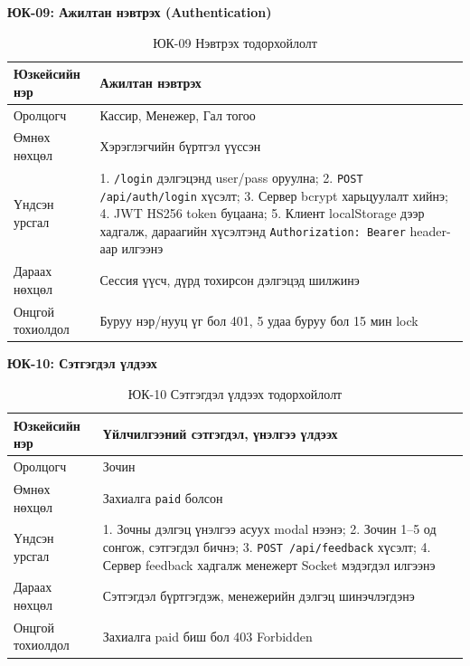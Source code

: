 \textbf{ЮК-09: Ажилтан нэвтрэх (Authentication)}

\begin{table}[htbp]
\caption{ЮК-09 Нэвтрэх тодорхойлолт}
\label{tab:uc09}
\centering
\small
\begin{tabularx}{\textwidth}{|L|L|}
\hline
{}
Юзкейсийн нэр & Ажилтан нэвтрэх \\ \hline
Оролцогч & Кассир, Менежер, Гал тогоо \\ \hline
{}
Өмнөх нөхцөл & Хэрэглэгчийн бүртгэл үүссэн \\ \hline
Үндсэн урсгал & 1. \texttt{/login} дэлгэцэнд user/pass оруулна;
  2. \texttt{POST /api/auth/login} хүсэлт;
  3. Сервер bcrypt харьцуулалт хийнэ;
  4. JWT HS256 token буцаана;
  5. Клиент localStorage дээр хадгалж, дараагийн хүсэлтэнд \texttt{Authorization: Bearer} header-аар илгээнэ \\ \hline
{}
Дараах нөхцөл & Сессия үүсч, дүрд тохирсон дэлгэцэд шилжинэ \\ \hline
Онцгой тохиолдол & Буруу нэр/нууц үг бол 401, 5 удаа буруу бол 15 мин lock \\ \hline
\end{tabularx}
\end{table}

\textbf{ЮК-10: Сэтгэгдэл үлдээх}

\begin{table}[htbp]
\caption{ЮК-10 Сэтгэгдэл үлдээх тодорхойлолт}
\label{tab:uc10}
\centering
\small
\begin{tabularx}{\textwidth}{|L|L|}
\hline
{}
Юзкейсийн нэр & Үйлчилгээний сэтгэгдэл, үнэлгээ үлдээх \\ \hline
Оролцогч & Зочин \\ \hline
{}
Өмнөх нөхцөл & Захиалга \texttt{paid} болсон \\ \hline
Үндсэн урсгал & 1. Зочны дэлгэц үнэлгээ асуух modal нээнэ;
  2. Зочин 1--5 од сонгож, сэтгэгдэл бичнэ;
  3. \texttt{POST /api/feedback} хүсэлт;
  4. Сервер feedback хадгалж менежерт Socket мэдэгдэл илгээнэ \\ \hline
{}
Дараах нөхцөл & Сэтгэгдэл бүртгэгдэж, менежерийн дэлгэц шинэчлэгдэнэ \\ \hline
Онцгой тохиолдол & Захиалга paid биш бол 403 Forbidden \\ \hline
\end{tabularx}
\end{table}
